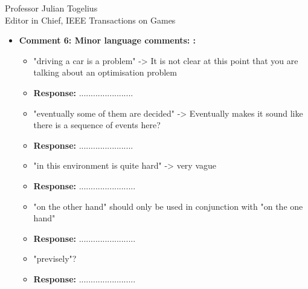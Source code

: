 \documentclass[10pt]{letter} %
\begin{document}
\begin{letter}{Professor Julian Togelius \\ Editor in Chief, IEEE Transactions on Games}
\begin{enumerate}
\begin{itemize}
	\item {\bf   Comment 6: Minor language comments: :} 
				\begin{itemize}
				\item 	"driving a car is a problem" -> It is not clear at this point that you are talking about an optimisation problem\\
				\item {\bf Response:}  .......................
				\item 	"eventually some of them are decided" -> Eventually makes it sound like there is a sequence of events here?\\
				\item {\bf Response:} .......................
	

				\item 	"in this environment is quite hard" -> very vague\\
				\item {\bf Response:} ........................

				\item 	"on the other hand" should only be used in conjunction with "on the one hand"\\
				\item {\bf Response:} ........................
				\item 	"previsely"?\\
				\item {\bf Response:} ........................
			
			\end{itemize}
	
\end{itemize}
\end{enumerate}
 






\end{letter}
 
\end{document}
